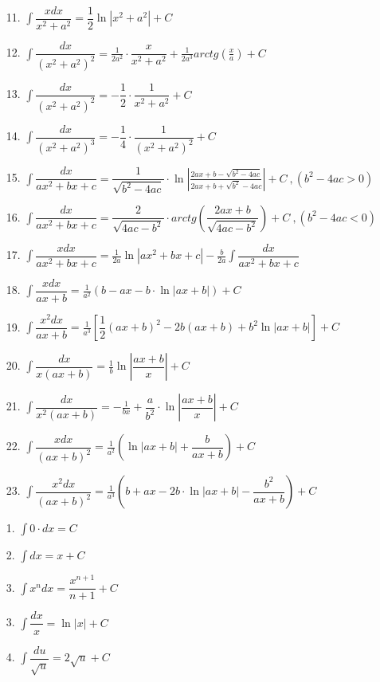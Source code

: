 \documentclass[12pt,4paper]{report}
\begin{document}
\begin{landscape}
\begin{itemize}
\item[11.] $\int\dfrac{xdx}{x^2 + a^2} = \dfrac{1}{2}\ln\left|x^2+a^2\right|+C$
\item[12.] $ \int \dfrac{dx}{(x^2 + a^2)^2} = \frac{1}{2a^2} \cdot \dfrac{x}{x^2 + a^2} + \frac{1}{2a^3}arctg \left(\frac{x}{a} \right) + C $
\item[13.] $\int \dfrac{dx}{(x^2 + a^2)^2} = -\dfrac{1}{2} \cdot \dfrac{1}{x^2 + a^2} + C $
\item[14.] $\int \dfrac{dx}{(x^2 + a^2)^3} = -\dfrac{1}{4} \cdot \dfrac{1}{(x^2 + a^2)^2} + C $
\item[15.] $\int \dfrac{dx}{ax^2 + bx + c}=\dfrac{1}{\sqrt{b^2-4ac}}\cdot \ln \left|\frac{2ax + b-\sqrt{b^2-4ac}}{2ax + b+\sqrt{b^2}-4ac} \right| + C \ , (b^2-4ac > 0) $
\item[16.] $ \int \dfrac{dx}{ax^2 + bx + c} = \dfrac{2}{\sqrt{4ac-b^2}} \cdot arctg \left(\dfrac{2ax+b}{\sqrt{4ac-b^2}} \right)+C \ ,(b^2 - 4ac < 0) $
\item[17.] $ \int \dfrac{xdx}{ax^2 + bx + c} = \frac{1}{2a}\ln |ax^2 + bx +c|-\frac{b}{2a}\int \dfrac{dx}{ax^2 + bx + c} $
\item[18.] $ \int \dfrac{xdx}{ax+b} = \frac{1}{a^2}(b-ax-b \cdot \ln |ax+b|) + C $
\item[19.]$\int \dfrac{x^2dx}{ax+b} = \frac{1}{a^3}\left[\dfrac{1}{2}(ax+b)^2 -2b(ax + b)+b^2\ln|ax+b| \right]+C$
\item[20.] $\int \dfrac{dx}{x(ax+b)}=\frac{1}{b}\ln \left|\dfrac{ax+b}{x} \right| + C   $
\item[21.] $\int \dfrac{dx}{x^2(ax+b)}=-\frac{1}{bx}+\dfrac{a}{b^2} \cdot \ln \left|\dfrac{ax+b}{x} \right| + C   $
\item[22.] $\int \dfrac{xdx}{(ax+b)^2} = \frac{1}{a^2} \left(\ln|ax+b| + \dfrac{b}{ax+b} \right) + C $
\item[23.] $\int \dfrac{x^2dx}{(ax+b)^2} = \frac{1}{a^3} \left(b+ax-2b \cdot \ln |ax+b| - \dfrac{b^2}{ax+b} \right) + C$
\end{itemize}
\newpage
  \begin{multicols}{3}
    \begin{itemize}
\item[1.] $\int 0 \cdot dx = C $
\item[2.] $\int dx = x + C $
\item[3.] $\int x^n dx = \dfrac{x^{n+1}}{n+1} + C  $
\item[3.] $\int \dfrac{dx}{x} = \ln|x| + C   $
\item[4.] $\int \dfrac{du}{\sqrt{u}} = 2\sqrt{u} + C $

\end{itemize}
\end{multicols}
\end{landscape}
\end{document}
